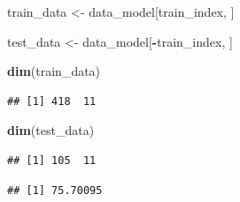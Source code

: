 \documentclass[
]{article}
\newenvironment{Shaded}{\begin{snugshade}}{\end{snugshade}}
\newcommand{\AttributeTok}[1]{\textcolor[rgb]{0.13,0.29,0.53}{#1}}
\newcommand{\ConstantTok}[1]{\textcolor[rgb]{0.56,0.35,0.01}{#1}}
\newcommand{\FunctionTok}[1]{\textcolor[rgb]{0.13,0.29,0.53}{\textbf{#1}}}
\newcommand{\NormalTok}[1]{#1}
\newcommand{\OtherTok}[1]{\textcolor[rgb]{0.56,0.35,0.01}{#1}}
\newcommand{\SpecialCharTok}[1]{\textcolor[rgb]{0.81,0.36,0.00}{\textbf{#1}}}
\begin{document}
\begin{Shaded}
\begin{Highlighting}[]
\NormalTok{train\_data }\OtherTok{\textless{}{-}}\NormalTok{ data\_model[train\_index, ]}
\end{Highlighting}
\end{Shaded}

\begin{Shaded}
\begin{Highlighting}[]
\NormalTok{test\_data }\OtherTok{\textless{}{-}}\NormalTok{ data\_model[}\SpecialCharTok{{-}}\NormalTok{train\_index, ]}
\end{Highlighting}
\end{Shaded}

\begin{Shaded}
\begin{Highlighting}[]
\FunctionTok{dim}\NormalTok{(train\_data)}
\end{Highlighting}
\end{Shaded}

\begin{verbatim}
## [1] 418  11
\end{verbatim}

\begin{Shaded}
\begin{Highlighting}[]
\FunctionTok{dim}\NormalTok{(test\_data)}
\end{Highlighting}
\end{Shaded}

\begin{verbatim}
## [1] 105  11
\end{verbatim}

\begin{Shaded}
\end{Shaded}

\begin{verbatim}
## [1] 75.70095
\end{verbatim}

\begin{Shaded}
\end{Shaded}
\end{document}
